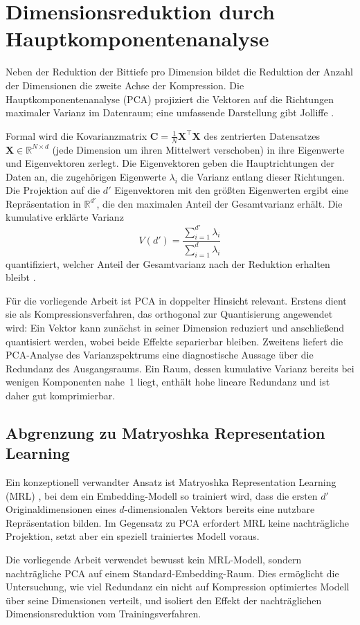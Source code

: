 \section{Dimensionsreduktion durch Hauptkomponentenanalyse}
\label{sec:grundlagen_pca}
%
Neben der Reduktion der Bittiefe pro Dimension bildet die Reduktion der Anzahl der Dimensionen die zweite Achse der Kompression.
Die Hauptkomponentenanalyse (PCA) \cite{pearson_1901_pca,hotelling_1933_pca} projiziert die Vektoren auf die Richtungen maximaler Varianz im Datenraum; eine umfassende Darstellung gibt Jolliffe \cite{jolliffe_2002_pca}.
\par
Formal wird die Kovarianzmatrix $\mathbf{C} = \frac{1}{N}\mathbf{X}^\top \mathbf{X}$ des zentrierten Datensatzes $\mathbf{X} \in \mathbb{R}^{N \times d}$ (jede Dimension um ihren Mittelwert verschoben) in ihre Eigenwerte und Eigenvektoren zerlegt.
Die Eigenvektoren geben die Hauptrichtungen der Daten an, die zugehörigen Eigenwerte $\lambda_i$ die Varianz entlang dieser Richtungen.
Die Projektion auf die $d'$ Eigenvektoren mit den größten Eigenwerten ergibt eine Repräsentation in $\mathbb{R}^{d'}$, die den maximalen Anteil der Gesamtvarianz erhält.
Die kumulative erklärte Varianz
\begin{equation}
  V(d') = \frac{\sum_{i=1}^{d'} \lambda_i}{\sum_{i=1}^{d} \lambda_i}
\end{equation}
quantifiziert, welcher Anteil der Gesamtvarianz nach der Reduktion erhalten bleibt \cite{jolliffe_2002_pca,jolliffe_2016_pca_review}.
\par
Für die vorliegende Arbeit ist PCA in doppelter Hinsicht relevant.
Erstens dient sie als Kompressionsverfahren, das orthogonal zur Quantisierung angewendet wird: Ein Vektor kann zunächst in seiner Dimension reduziert und anschließend quantisiert werden, wobei beide Effekte separierbar bleiben.
Zweitens liefert die PCA-Analyse des Varianzspektrums eine diagnostische Aussage über die Redundanz des Ausgangsraums.
Ein Raum, dessen kumulative Varianz bereits bei wenigen Komponenten nahe~1 liegt, enthält hohe lineare Redundanz und ist daher gut komprimierbar.
%
\subsection{Abgrenzung zu Matryoshka Representation Learning}
%
Ein konzeptionell verwandter Ansatz ist Matryoshka Representation Learning (MRL) \cite{kusupati_2022_matryoshka}, bei dem ein Embedding-Modell so trainiert wird, dass die ersten $d'$ Originaldimensionen eines $d$-dimensionalen Vektors bereits eine nutzbare Repräsentation bilden.
Im Gegensatz zu PCA erfordert MRL keine nachträgliche Projektion, setzt aber ein speziell trainiertes Modell voraus.
\par
Die vorliegende Arbeit verwendet bewusst kein MRL-Modell, sondern nachträgliche PCA auf einem Standard-Embedding-Raum.
Dies ermöglicht die Untersuchung, wie viel Redundanz ein nicht auf Kompression optimiertes Modell über seine Dimensionen verteilt, und isoliert den Effekt der nachträglichen Dimensionsreduktion vom Trainingsverfahren.
%
%
